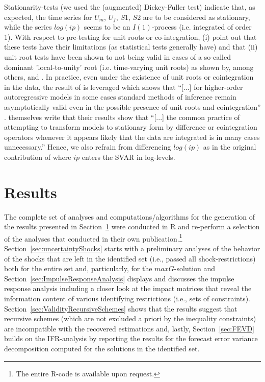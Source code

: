 \documentclass[a4paper,11pt,listof=nochaptergap,oneside,pointednumbers,bibtotoc,bigheadings,liststotoc,hidelinks]{scrbook}
\theoremstyle{mysatz}
\theoremstyle{mydefinition}
\theoremstyle{mytheorem}
\theoremstyle{mybemerkung}
\begin{document}
Stationarity-tests (we used the (augmented) Dickey-Fuller test) indicate that, as expected, the time series for $U_m$, $U_f$, $S1$, $S2$ are to be considered as stationary, while the series $log(ip)$ seems to be an $I(1)$-process (i.e. integrated of order 1). With respect to pre-testing for unit roots or co-integration, \citet{lutkepohlkilian:17} (i) point out that these tests have their limitations (as statistical tests generally have) and that (ii) unit root tests have been shown to not being valid in cases of a so-called dominant 'local-to-unity' root (i.e. time-varying unit roots) as shown by, among others, \citet{elliotAndStock:94} and \citet{cavanaghetal:95}. In practice, even under the existence of unit roots or cointegration in the data, the result of \citet{simsetal:90} is leveraged which shows that ``[...] for higher-order autoregressive models in some cases standard methods of inference remain asymptotically valid even in the possible presence of unit roots and cointegration'' \citep[p. 107]{lutkepohlkilian:17}. \citet{simsetal:90} themselves write that their results show that ``[...] the common practice of attempting to transform models to stationary form by difference or cointegration operators whenever it appears likely that the data are integrated is in many cases unnecessary.'' Hence, we also refrain from differencing $log(ip)$ as in the original contribution of \citet{ludvigsonetal:19} where $ip$ enters the SVAR in log-levels.



\chapter{Results}
\label{Results}

The complete set of analyses and computations/algorithms for the generation of the results presented in Section~\ref{Results} were conducted in R and re-perform a selection of the analyses that \citet{ludvigsonetal:19} conducted in their own publication.\footnote{The entire R-code is available upon request.} Section~\ref{sec:uncertaintyShocks} starts with a preliminary analyses of the behavior of the shocks that are left in the identified set (i.e., passed all shock-restrictions) both for the entire set and, particularly, for the $maxG$-solution and Section~\ref{sec:ImpulseResponseAnalysis} displays and discusses the impulse response analysis including a closer look at the impact matrices that reveal the information content of various identifying restrictions (i.e., sets of constraints). Section~\ref{sec:ValidityRecursiveSchemes} shows that the results suggest that recursive schemes (which are not excluded a priori by the inequality constraints) are incompatible with the recovered estimations and, lastly, Section~\ref{sec:FEVD} builds on the IFR-analysis by reporting the results for the forecast error variance decomposition computed for the solutions in the identified set.
\end{document}
